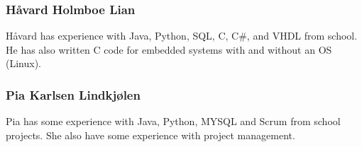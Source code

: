 \subsubsection{Håvard	Holmboe	Lian}
Håvard has experience with Java, Python, SQL, C, C\#, and VHDL from school. He has also written C code for embedded systems with and without an OS (Linux). 

\subsubsection{Pia	Karlsen	Lindkjølen}
Pia has some experience with Java, Python, MYSQL and Scrum from school projects. She also have some experience with project management. 
